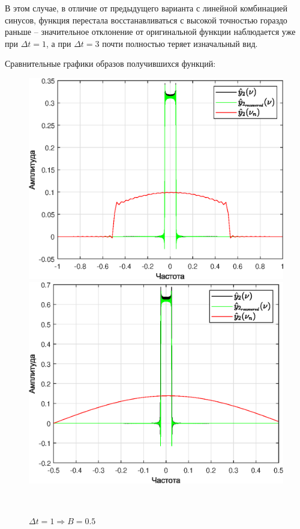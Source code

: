 \documentclass[a4paper]{article}
\begin{document}
В этом случае, в отличие от предыдущего варианта с линейной комбинацией синусов, функция перестала восстанавливаться с высокой точностью гораздо раньше -- значительное отклонение от оригинальной функции наблюдается уже при $\Delta t = 1$, а при $\Delta t = 3$ почти полностью теряет изначальный вид.

Сравнительные графики образов получившихся функций:

\begin{figure}[H]
    \begin{minipage}{0.5\textwidth}
        \centering \includegraphics[width=\textwidth]{graphs2/T_50_dt_0.5_B_1_dv_0.02/func2_image.eps}
        \caption{$\Delta t = 0.5 \Rightarrow B = 1$}
    \end{minipage}\hfill
    \begin{minipage}{0.5\textwidth}
        \centering \includegraphics[width=\textwidth]{graphs2/T_50_dt_1_B_0.5_dv_0.02/func2_image.eps}
        \caption{$\Delta t = 1 \Rightarrow B = 0.5$}
    \end{minipage}\\[1em]
\end{figure}\noindent\
\end{document}
